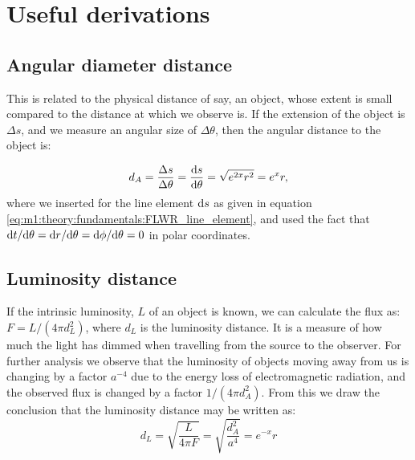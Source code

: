 

\section{Useful derivations}\label{app:derivations}
    \subsection{Angular diameter distance}
        This is related to the physical distance of say, an object, whose extent is small compared to the distance at which we observe is. If the extension of the object is $\Delta s$, and we measure an angular size of $\Delta\theta$, then the angular distance to the object is:

        \begin{equation}\label{eq:app:derivations:angular_distance}
            d_A = \frac{\Delta s}{\Delta\theta} = \frac{\mathrm{d} s}{\mathrm{d}\theta} = \sqrt{e^{2x}r^2} = e^xr,
        \end{equation}
        where we inserted for the line element $\mathrm{d} s$ as given in equation \cref{eq:m1:theory:fundamentals:FLWR_line_element}, and used the fact that $\mathrm{d} t/\mathrm{d} \theta = \mathrm{d} r/\mathrm{d}\theta = \mathrm{d}\phi/\mathrm{d}\theta  = 0$ in polar coordinates. 

    \subsection{Luminosity distance}
        If the intrinsic luminosity, $L$ of an object is known, we can calculate the flux as: $F=L/(4\pi d_L^2)$, where $d_L$ is the luminosity distance. It is a measure of how much the light has dimmed when travelling from the source to the observer. For further analysis we observe that the luminosity of objects moving away from us is changing by a factor $a^{-4}$ due to the energy loss of electromagnetic radiation, and the observed flux is changed by a factor $1/(4\pi d_A^2)$. From this we draw the conclusion that the luminosity distance may be written as:
        \begin{equation}
            d_L = \sqrt{\frac{L}{4\pi F}} = \sqrt{\frac{d_A^2}{a^4}} = e^{-x}r 
        \end{equation}

